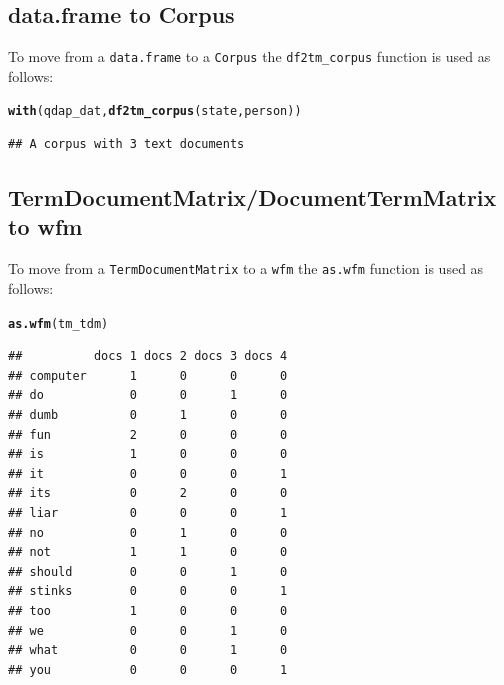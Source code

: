 \documentclass{article}\usepackage[]{graphicx}\usepackage[]{color}
\makeatletter
\newcommand{\hlstd}[1]{\textcolor[rgb]{0.345,0.345,0.345}{#1}}%
\newcommand{\hlkwd}[1]{\textcolor[rgb]{0.737,0.353,0.396}{\textbf{#1}}}%
\newenvironment{kframe}{%
 \def\at@end@of@kframe{}%
 \ifinner\ifhmode%
  \def\at@end@of@kframe{\end{minipage}}%
  \begin{minipage}{\columnwidth}%
 \fi\fi%
 \def\FrameCommand##1{\hskip\@totalleftmargin \hskip-\fboxsep
 \colorbox{shadecolor}{##1}\hskip-\fboxsep
     \hskip-\linewidth \hskip-\@totalleftmargin \hskip\columnwidth}%
 \MakeFramed {\advance\hsize-\width
   \@totalleftmargin\z@ \linewidth\hsize
   \@setminipage}}%
 {\par\unskip\endMakeFramed%
 \at@end@of@kframe}
\newenvironment{knitrout}{}{} %
\makeatother
\begin{document}
\subsection{data.frame to Corpus}

To move from a \texttt{data.frame} to a \texttt{Corpus} the \texttt{df2tm\_corpus} function is used as follows:

\begin{knitrout}
\color{fgcolor}\begin{kframe}
\begin{alltt}
\hlkwd{with}\hlstd{(qdap_dat,} \hlkwd{df2tm_corpus}\hlstd{(state, person))}
\end{alltt}
\begin{verbatim}
## A corpus with 3 text documents
\end{verbatim}
\end{kframe}
\end{knitrout}



\subsection{TermDocumentMatrix/DocumentTermMatrix to wfm}

To move from a \texttt{TermDocumentMatrix} to a \texttt{wfm} the \texttt{as.wfm} function is used as follows:

\begin{knitrout}
\color{fgcolor}\begin{kframe}
\begin{alltt}
\hlkwd{as.wfm}\hlstd{(tm_tdm)}
\end{alltt}
\begin{verbatim}
##          docs 1 docs 2 docs 3 docs 4
## computer      1      0      0      0
## do            0      0      1      0
## dumb          0      1      0      0
## fun           2      0      0      0
## is            1      0      0      0
## it            0      0      0      1
## its           0      2      0      0
## liar          0      0      0      1
## no            0      1      0      0
## not           1      1      0      0
## should        0      0      1      0
## stinks        0      0      0      1
## too           1      0      0      0
## we            0      0      1      0
## what          0      0      1      0
## you           0      0      0      1
\end{verbatim}
\end{kframe}
\end{knitrout}
\end{document}
